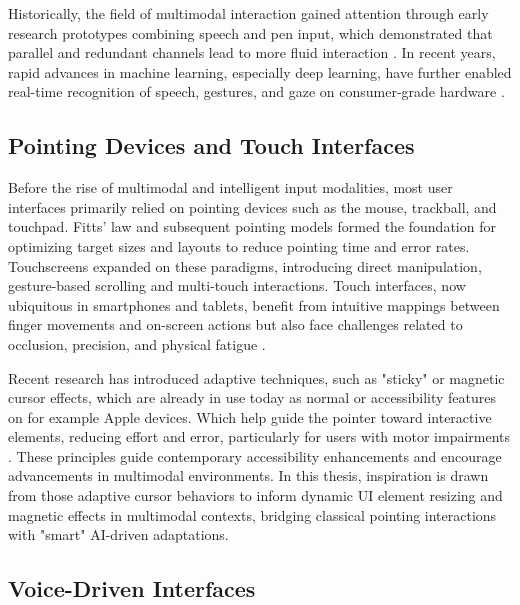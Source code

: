 \documentclass[openany]{book}
\begin{document}

Historically, the field of multimodal interaction gained attention through early research prototypes combining speech and pen input, which demonstrated that parallel and redundant channels lead to more fluid interaction \cite{10.1145/319382.319398, Oviatt2004}. In recent years, rapid advances in machine learning, especially deep learning, have further enabled real-time recognition of speech, gestures, and gaze on consumer-grade hardware \cite{lugaresi2019mediapipeframeworkbuildingperception, Choudhury2015}.

\subsection{Pointing Devices and Touch Interfaces}
Before the rise of multimodal and intelligent input modalities, most user interfaces primarily relied on pointing devices such as the mouse, trackball, and touchpad. Fitts' law \cite{Fitts1954} and subsequent pointing models formed the foundation for optimizing target sizes and layouts to reduce pointing time and error rates.  
Touchscreens expanded on these paradigms, introducing direct manipulation, gesture-based scrolling and multi-touch interactions. Touch interfaces, now ubiquitous in smartphones and tablets, benefit from intuitive mappings between finger movements and on-screen actions but also face challenges related to occlusion, precision, and physical fatigue \cite{Wigdor2011BraveNUI}.

Recent research has introduced adaptive techniques, such as "sticky" or magnetic cursor effects, which are already in use today as normal or accessibility features on for example Apple devices. Which help guide the pointer toward interactive elements, reducing effort and error, particularly for users with motor impairments \cite{Cockburn2008Sticky}. These principles guide contemporary accessibility enhancements and encourage advancements in multimodal environments.
In this thesis, inspiration is drawn from those adaptive cursor behaviors to inform dynamic UI element resizing and magnetic effects in multimodal contexts, bridging classical pointing interactions with "smart" AI-driven adaptations.

\subsection{Voice-Driven Interfaces}
\end{document}
